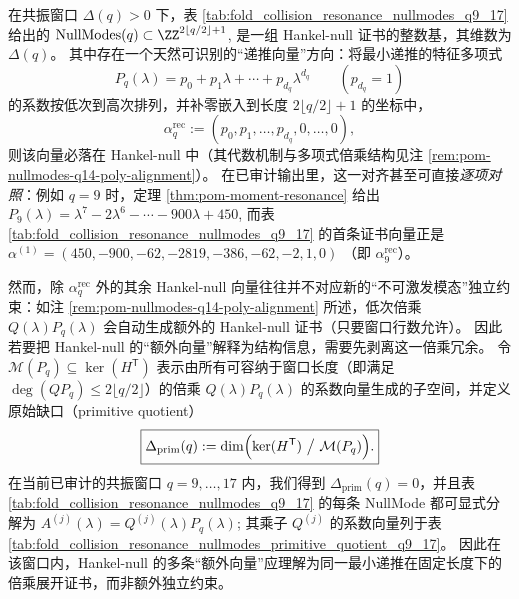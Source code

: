 



\begin{remark}\label{rem:pom-nullmodes-recurrence-plus-signature}
在共振窗口 \(\Delta(q)>0\) 下，表 \ref{tab:fold_collision_resonance_nullmodes_q9_17} 给出的
\(
\mathrm{NullModes}(q)\subset\ZZ^{2\lfloor q/2\rfloor+1}
\),
是一组 Hankel-null 证书的整数基，其维数为 \(\Delta(q)\)。
其中存在一个天然可识别的“递推向量”方向：将最小递推的特征多项式
\[
P_q(\lambda)=p_0+p_1\lambda+\cdots+p_{d_q}\lambda^{d_q}\qquad(p_{d_q}=1)
\]
的系数按低次到高次排列，并补零嵌入到长度 \(2\lfloor q/2\rfloor+1\) 的坐标中，
\[
\alpha^{\mathrm{rec}}_q:=(p_0,p_1,\ldots,p_{d_q},0,\ldots,0),
\]
则该向量必落在 Hankel-null 中（其代数机制与多项式倍乘结构见注 \ref{rem:pom-nullmodes-q14-poly-alignment}）。
在已审计输出里，这一对齐甚至可直接\emph{逐项对照}：例如 \(q=9\) 时，定理 \ref{thm:pom-moment-resonance} 给出
\(
P_9(\lambda)=\lambda^7-2\lambda^6-\cdots-900\lambda+450
\),
而表 \ref{tab:fold_collision_resonance_nullmodes_q9_17} 的首条证书向量正是
\(
\alpha^{(1)}=(450,-900,-62,-2819,-386,-62,-2,1,0)
\)
（即 \(\alpha^{\mathrm{rec}}_9\)）。
\par
然而，除 \(\alpha^{\mathrm{rec}}_q\) 外的其余 Hankel-null 向量往往并不对应新的“不可激发模态”独立约束：如注 \ref{rem:pom-nullmodes-q14-poly-alignment} 所述，低次倍乘 \(Q(\lambda)P_q(\lambda)\) 会自动生成额外的 Hankel-null 证书（只要窗口行数允许）。
因此若要把 Hankel-null 的“额外向量”解释为结构信息，需要先剥离这一倍乘冗余。
令 \(\mathcal{M}(P_q)\subseteq\ker(H^{\mathsf T})\) 表示由所有可容纳于窗口长度（即满足 \(\deg(QP_q)\le 2\lfloor q/2\rfloor\)）的倍乘 \(Q(\lambda)P_q(\lambda)\) 的系数向量生成的子空间，并定义原始缺口（primitive quotient）
\[
\boxed{
\Delta_{\mathrm{prim}}(q):=\dim\Bigl(\ker(H^{\mathsf T})\ \big/\ \mathcal{M}(P_q)\Bigr).
}
\]
在当前已审计的共振窗口 \(q=9,\dots,17\) 内，我们得到 \(\Delta_{\mathrm{prim}}(q)=0\)，并且表 \ref{tab:fold_collision_resonance_nullmodes_q9_17} 的每条 NullMode 都可显式分解为
\(
A^{(j)}(\lambda)=Q^{(j)}(\lambda)P_q(\lambda)
\);
其乘子 \(Q^{(j)}\) 的系数向量列于表 \ref{tab:fold_collision_resonance_nullmodes_primitive_quotient_q9_17}。
因此在该窗口内，Hankel-null 的多条“额外向量”应理解为同一最小递推在固定长度下的倍乘展开证书，而非额外独立约束。
\end{remark}

